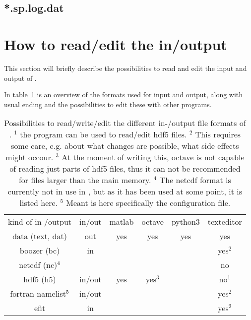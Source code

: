 \subsection{*.sp.log.dat}

\section{How to read/edit the in/output}
This section will briefly describe the possibilities to read and edit
the input and output of \neotwo.

In table~\ref{tablereadinginoutput} is an overview of the formats used
for input and output, along with usual ending and the possibilities to
edit these with other programs.

\begin{table}
  \begin{center}
    \begin{tabular}{cccccc}
kind of in-/output & in/out & matlab & octave & python3 & texteditor \\
data (text, dat)   & out    & yes    & yes    & yes     & yes \\
boozer (bc)        & in     &        &        &         & yes$^2$ \\
netcdf (nc)$^4$    &        &        &        &         & no \\
hdf5 (h5)          & in/out & yes    & yes$^3$&         & no$^1$ \\
fortran namelist$^5$&in/out &        &        &         & yes$^2$ \\
efit               & in     &        &        &         & yes$^2$
    \end{tabular}
    \caption{Possibilities to read/write/edit the different in-/output
file formats of \neotwo.
$^1$ the program  can be used to read/edit hdf5 files.
$^2$ This requires some care, e.g. about what changes are possible, what
side effects might occour.
$^3$ At the moment of writing this, octave is not capable of reading
just parts of hdf5 files, thus it can not be recommended for files
larger than the main memory.
$^4$ The netcdf format is currently not in use in \neotwo, but as it has
been used at some point, it is listed here.
$^5$ Meant is here specifically the \neotwo configuration file.}
    \label{tablereadinginoutput}
  \end{center}
\end{table}

